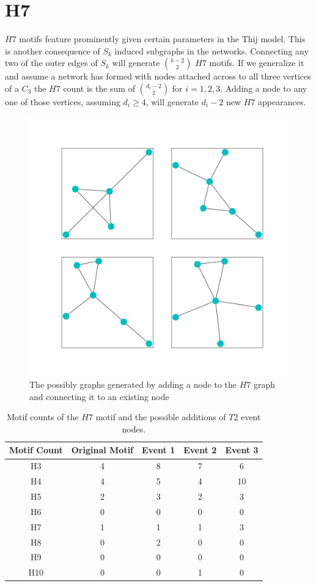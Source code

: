 \section{H7}
$H7$ motifs feature prominently given certain parameters in the Thij model. This is another consequence
of $S_k$ induced subgraphs in the networks. Connecting any two of the outer edges of $S_k$
will generate ${k-2 \choose 2}$ $H7$ motifs. If we generalize it and assume a network has
formed with nodes attached across to all three vertices of a $C_3$ the $H7$ count is
the sum of ${d_i-2 \choose 2}$ for $i=1,2,3$. Adding a node to any one of those vertices, assuming 
$d_i\geq 4$, will generate $d_i-2$ new $H7$ appearances.

\begin{figure}[!ht]
    \includegraphics[width=12cm]{Images/H7_evolution.png}
    \centering
    \caption{The possibly graphs generated by adding a node to the $H7$ graph 
    and connecting it to an existing node}
\end{figure}
\FloatBarrier

\begin{table}
    \centering
    \begin{tabular}{||c c c c c||} 
    \hline
    Motif Count & Original Motif & Event 1 & Event 2 & Event 3 \\ [0.5ex] 
    \hline\hline
    H3 & 4 & 8 & 7 & 6\\ 
    \hline
    H4 & 4 & 5 & 4 & 10\\
    \hline
    H5 & 2 & 3 & 2 & 3\\
    \hline
    H6 & 0 & 0 & 0 & 0\\
    \hline
    H7 & 1 & 1 & 1 & 3\\
    \hline
    H8 & 0 & 2 & 0 & 0\\
    \hline
    H9 & 0 & 0 & 0 & 0\\
    \hline
    H10 & 0 & 0 & 1 & 0\\
    \hline
   \end{tabular}
   \caption{Motif counts of the $H7$ motif and the possible additions of $T2$ event nodes.}
   \label{table:5}
\end{table}


